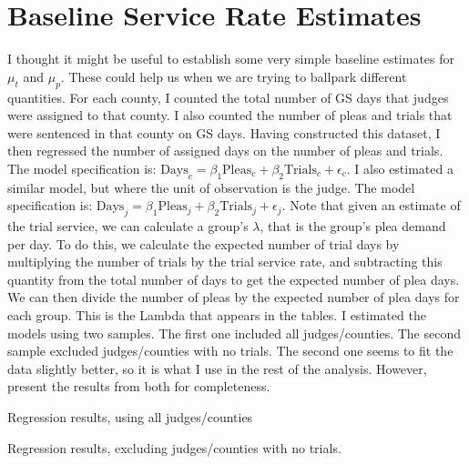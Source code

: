 \documentclass[11pt]{article}
\begin{document}
\section{Baseline Service Rate Estimates}
  I thought it might be useful to establish some very simple baseline estimates for
  $\mu_t$ and $\mu_p$. These could help us when we are trying to ballpark different quantities.
  For each county, I counted the total number of GS days that judges were assigned to that county.
  I also counted the number of pleas and trials that were sentenced in that county on GS days.
  Having constructed this dataset, I then regressed the number of assigned days on the number of pleas
  and trials. The model specification is: $\text{Days}_c = \beta_1 \text{Pleas}_c + \beta_2 \text{Trials}_c + \epsilon_c$. I also estimated a similar model, but where the unit of observation is the judge. The model specification is: $\text{Days}_j = \beta_1 \text{Pleas}_j + \beta_2 \text{Trials}_j + \epsilon_j$. Note that given an estimate of the trial service, we can calculate a group's $\lambda$, that is the group's plea demand per day. To do this, we calculate the expected number of trial days by multiplying the number of trials by the trial service rate, and subtracting this quantity from the total number of days to get the expected number of plea days. We can then divide the number of pleas by the expected number of plea days for each group. This is the Lambda that appears in the tables. I estimated the models using two samples. The first one included all judges/counties. The second sample excluded judges/counties with no trials. The second one seems to fit the data slightly better, so it is what I use in the rest of the analysis. However, present the results from both for completeness.

  \begin{table}[H]
    \centering
    \caption{Regression results, using all judges/counties}
    \label{reg-results-full}
    
  \end{table}

  \begin{table}[H]
    \centering
    \caption{Regression results, excluding judges/counties with no trials. }
    \label{reg-results}
    
  \end{table}
\end{document}

